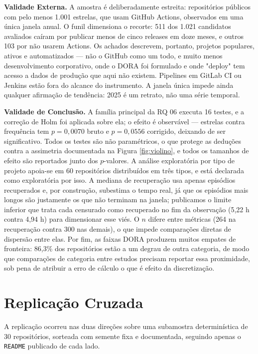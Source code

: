 \textbf{Validade Externa.} A amostra é deliberadamente estreita: repositórios públicos com
pelo menos 1.001 estrelas, que usam GitHub Actions, observados em uma única janela anual. O
funil dimensiona o recorte: 511 dos 1.021 candidatos avaliados caíram por publicar menos de
cinco releases em doze meses, e outros 103 por não usarem Actions. Os achados descrevem,
portanto, projetos populares, ativos e automatizados --- não o GitHub como um todo, e muito
menos desenvolvimento corporativo, onde o DORA foi formulado e onde "deploy" tem acesso a
dados de produção que aqui não existem. Pipelines em GitLab CI ou Jenkins estão fora do
alcance do instrumento. A janela única impede ainda qualquer afirmação de tendência: 2025 é
um retrato, não uma série temporal.

\textbf{Validade de Conclusão.} A família principal da RQ 06 executa 16 testes, e a correção
de Holm foi aplicada sobre ela; o efeito é observável --- estrelas contra frequência tem
$p = 0{,}0070$ bruto e $p = 0{,}0556$ corrigido, deixando de ser significativo. Todos os
testes são não paramétricos, o que protege as deduções contra a assimetria documentada na
Figura \ref{fig:violino}, e todos os tamanhos de efeito são reportados junto dos $p$-valores.
A análise exploratória por tipo de projeto apoia-se em 60 repositórios distribuídos em três
tipos, e está declarada como exploratória por isso. A mediana de recuperação usa apenas
episódios recuperados e, por construção, subestima o tempo real, já que os episódios mais
longos são justamente os que não terminam na janela; publicamos o limite inferior que trata
cada censurado como recuperado no fim da observação (5,22 h contra 4,94 h) para dimensionar
esse viés. O $n$ difere entre métricas (264 na recuperação contra 300 nas demais), o que
impede comparações diretas de dispersão entre elas. Por fim, as faixas DORA produzem muitos
empates de fronteira: 86,3\% dos repositórios estão a um degrau de outra categoria, de modo
que comparações de categoria entre estudos precisam reportar essa proximidade, sob pena de
atribuir a erro de cálculo o que é efeito da discretização.

\section{Replicação Cruzada}
\label{sec:replicacao}

A replicação ocorreu nas duas direções sobre uma subamostra determinística de 30
repositórios, sorteada com semente fixa e documentada, seguindo apenas o \texttt{README}
publicado de cada lado.

